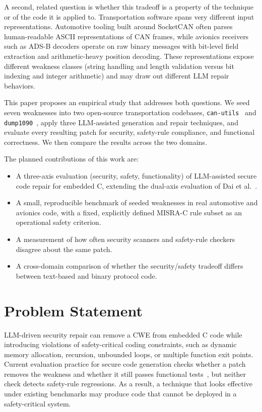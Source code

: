 \documentclass[12pt]{IEEEtran}
\begin{document}
A second, related question is whether this tradeoff is a property of the technique or of the code it is applied to. Transportation software spans very different input representations. Automotive tooling built around SocketCAN often parses human-readable ASCII representations of CAN frames, while avionics receivers such as ADS-B decoders operate on raw binary messages with bit-level field extraction and arithmetic-heavy position decoding. These representations expose different weakness classes (string handling and length validation versus bit indexing and integer arithmetic) and may draw out different LLM repair behaviors.

This paper proposes an empirical study that addresses both questions. We seed seven weaknesses into two open-source transportation codebases, \texttt{can-utils}~\cite{canutils} and \texttt{dump1090}~\cite{dump1090}, apply three LLM-assisted generation and repair techniques, and evaluate every resulting patch for security, safety-rule compliance, and functional correctness. We then compare the results across the two domains.

The planned contributions of this work are:
\begin{itemize}
    \item A three-axis evaluation (security, safety, functionality) of LLM-assisted secure code repair for embedded C, extending the dual-axis evaluation of Dai et al.~\cite{rethinking2026}.
    \item A small, reproducible benchmark of seeded weaknesses in real automotive and avionics code, with a fixed, explicitly defined MISRA-C rule subset as an operational safety criterion.
    \item A measurement of how often security scanners and safety-rule checkers disagree about the same patch.
    \item A cross-domain comparison of whether the security/safety tradeoff differs between text-based and binary protocol code.
\end{itemize}

\section{Problem Statement}
LLM-driven security repair can remove a CWE from embedded C code while introducing violations of safety-critical coding constraints, such as dynamic memory allocation, recursion, unbounded loops, or multiple function exit points. Current evaluation practice for secure code generation checks whether a patch removes the weakness and whether it still passes functional tests~\cite{rethinking2026}, but neither check detects safety-rule regressions. As a result, a technique that looks effective under existing benchmarks may produce code that cannot be deployed in a safety-critical system.
\end{document}
